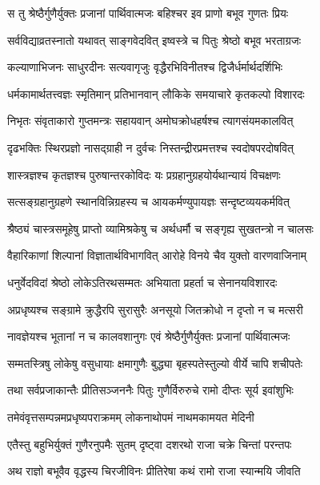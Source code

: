 \twolineshloka
{स तु श्रेष्ठैर्गुणैर्युक्तः प्रजानां पार्थिवात्मजः}
{बहिश्चर इव प्राणो बभूव गुणतः प्रियः} %

\twolineshloka
{सर्वविद्याव्रतस्नातो यथावत् साङ्गवेदवित्}
{इष्वस्त्रे च पितुः श्रेष्ठो बभूव भरताग्रजः} %

\twolineshloka
{कल्याणाभिजनः साधुरदीनः सत्यवागृजुः}
{वृद्धैरभिविनीतश्च द्विजैर्धर्मार्थदर्शिभिः} %

\twolineshloka
{धर्मकामार्थतत्त्वज्ञः स्मृतिमान् प्रतिभानवान्}
{लौकिके समयाचारे कृतकल्पो विशारदः} %

\twolineshloka
{निभृतः संवृताकारो गुप्तमन्त्रः सहायवान्}
{अमोघक्रोधहर्षश्च त्यागसंयमकालवित्} %

\twolineshloka
{दृढभक्तिः स्थिरप्रज्ञो नासद्ग्राही न दुर्वचः}
{निस्तन्द्रीरप्रमत्तश्च स्वदोषपरदोषवित्} %

\twolineshloka
{शास्त्रज्ञश्च कृतज्ञश्च पुरुषान्तरकोविदः}
{यः प्रग्रहानुग्रहयोर्यथान्यायं विचक्षणः} %

\twolineshloka
{सत्सङ्ग्रहानुग्रहणे स्थानविन्निग्रहस्य च}
{आयकर्मण्युपायज्ञः सन्दृष्टव्ययकर्मवित्} %

\twolineshloka
{श्रैष्ठ्यं चास्त्रसमूहेषु प्राप्तो व्यामिश्रकेषु च}
{अर्थधर्मौ च सङ्गृह्य सुखतन्त्रो न चालसः} %

\twolineshloka
{वैहारिकाणां शिल्पानां विज्ञातार्थविभागवित्}
{आरोहे विनये चैव युक्तो वारणवाजिनाम्} %

\twolineshloka
{धनुर्वेदविदां श्रेष्ठो लोकेऽतिरथसम्मतः}
{अभियाता प्रहर्ता च सेनानयविशारदः} %

\twolineshloka
{अप्रधृष्यश्च सङ्ग्रामे क्रुद्धैरपि सुरासुरैः}
{अनसूयो जितक्रोधो न दृप्तो न च मत्सरी} %

\twolineshloka
{नावज्ञेयश्च भूतानां न च कालवशानुगः}
{एवं श्रेष्ठैर्गुणैर्युक्तः प्रजानां पार्थिवात्मजः} %

\twolineshloka
{सम्मतस्त्रिषु लोकेषु वसुधायाः क्षमागुणैः}
{बुद्ध्या बृहस्पतेस्तुल्यो वीर्ये चापि शचीपतेः} %

\twolineshloka
{तथा सर्वप्रजाकान्तैः प्रीतिसञ्जननैः पितुः}
{गुणैर्विरुरुचे रामो दीप्तः सूर्य इवांशुभिः} %

\twolineshloka
{तमेवंवृत्तसम्पन्नमप्रधृष्यपराक्रमम्}
{लोकनाथोपमं नाथमकामयत मेदिनी} %

\twolineshloka
{एतैस्तु बहुभिर्युक्तं गुणैरनुपमैः सुतम्}
{दृष्ट्वा दशरथो राजा चक्रे चिन्तां परन्तपः} %

\twolineshloka
{अथ राज्ञो बभूवैव वृद्धस्य चिरजीविनः}
{प्रीतिरेषा कथं रामो राजा स्यान्मयि जीवति} %

